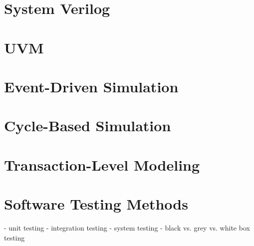 \documentclass[11pt]{article}
\begin{document}
\section{System Verilog}

\section{UVM}

\section{Event-Driven Simulation}

\section{Cycle-Based Simulation}

\section{Transaction-Level Modeling}

\section{Software Testing Methods}
- unit testing
- integration testing
- system testing
- black vs. grey vs. white box testing
\end{document}
